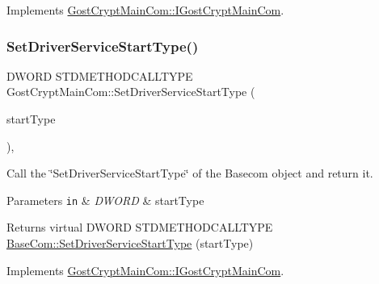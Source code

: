 Implements \hyperlink{interface_gost_crypt_main_com_1_1_i_gost_crypt_main_com}{Gost\+Crypt\+Main\+Com\+::\+I\+Gost\+Crypt\+Main\+Com}.

\mbox{\label{class_gost_crypt_main_com_a565cd48981c15a30f7c52227e414e61d}} 
\subsubsection{\texorpdfstring{Set\+Driver\+Service\+Start\+Type()}{SetDriverServiceStartType()}}
{\footnotesize\ttfamily D\+W\+O\+RD S\+T\+D\+M\+E\+T\+H\+O\+D\+C\+A\+L\+L\+T\+Y\+PE Gost\+Crypt\+Main\+Com\+::\+Set\+Driver\+Service\+Start\+Type (\begin{DoxyParamCaption}\item[{D\+W\+O\+RD}]{start\+Type }\end{DoxyParamCaption})\hspace{0.3cm}{\ttfamily [inline]}, {\ttfamily [virtual]}}



Call the \char`\"{}\+Set\+Driver\+Service\+Start\+Type\char`\"{} of the Basecom object and return it. 


\begin{DoxyParams}[1]{Parameters}
\mbox{\tt in}  & {\em D\+W\+O\+RD} & start\+Type \\
\hline
\end{DoxyParams}
\begin{DoxyReturn}{Returns}
virtual D\+W\+O\+RD S\+T\+D\+M\+E\+T\+H\+O\+D\+C\+A\+L\+L\+T\+Y\+PE \hyperlink{class_base_com_a4c4f6cb8a6560a8a44fa7053d1747ea7}{Base\+Com\+::\+Set\+Driver\+Service\+Start\+Type} (start\+Type) 
\end{DoxyReturn}


Implements \hyperlink{interface_gost_crypt_main_com_1_1_i_gost_crypt_main_com}{Gost\+Crypt\+Main\+Com\+::\+I\+Gost\+Crypt\+Main\+Com}.

